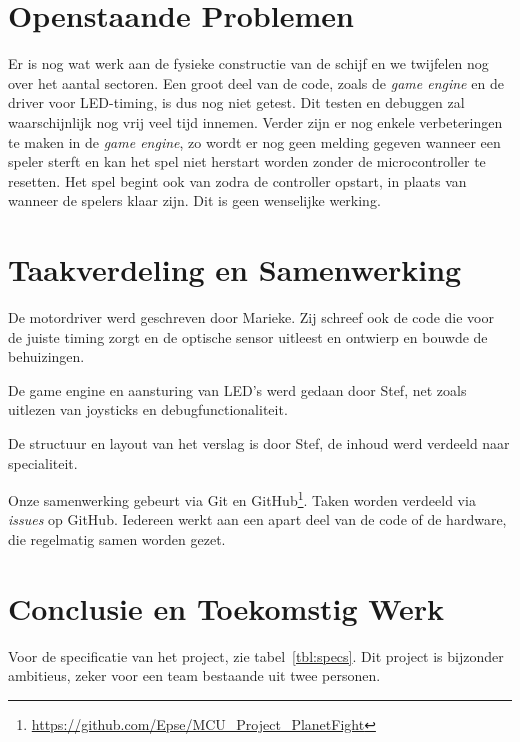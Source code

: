 \documentclass[12pt]{ugentreport}
\begin{document}
\section{Openstaande Problemen}
Er is nog wat werk aan de fysieke constructie van de schijf en we twijfelen nog
over het aantal sectoren. Een groot deel van de code, zoals de \emph{game
  engine} en de driver voor LED-timing, is dus nog niet getest.
Dit testen en debuggen zal waarschijnlijk nog vrij veel tijd innemen.
Verder zijn er nog enkele verbeteringen te maken in de \emph{game engine},
zo wordt er nog geen melding gegeven wanneer een speler sterft en kan het spel
niet herstart worden zonder de microcontroller te resetten.
Het spel begint ook van zodra de controller opstart, in plaats van wanneer de
spelers klaar zijn. Dit is geen wenselijke werking.


\section{Taakverdeling en Samenwerking}
De motordriver werd geschreven door Marieke. Zij schreef ook de code die voor de
juiste timing zorgt en de optische sensor uitleest en ontwierp en bouwde de behuizingen.

De game engine en aansturing van LED's werd gedaan door Stef,
net zoals uitlezen van joysticks en debugfunctionaliteit.

De structuur en layout van het verslag is door Stef, de inhoud werd verdeeld
naar specialiteit.

Onze samenwerking gebeurt via Git en
GitHub\footnote{\url{https://github.com/Epse/MCU_Project_PlanetFight}}. Taken worden
verdeeld via \emph{issues} op GitHub. Iedereen werkt aan een apart deel van de
code of de hardware, die regelmatig samen worden gezet.

\section{Conclusie en Toekomstig Werk}
Voor de specificatie van het project, zie tabel~\ref{tbl:specs}.
Dit project is bijzonder ambitieus, zeker voor een team bestaande uit twee
personen.
\end{document}
